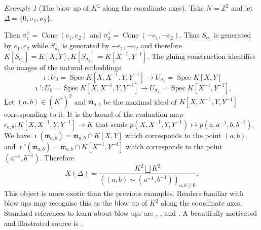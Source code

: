 \documentclass[BSc]{usydthesis}
\numberwithin{equation}{chapter}
\theoremstyle{remark}
\newtheorem{Example}[equation]{Example}
\newcommand{\Z}{\mathbb{Z}}
\newcommand{\V}{\vee}
\newcommand{\m}{\mathfrak{m}}
\DeclareMathOperator{\Cone}{Cone}
\DeclareMathOperator{\Spec}{Spec}
\begin{document}
\begin{Example}[The blow up of $K^2$ along the coordinate axes]
Take $N=\Z^2$ and let $\Delta =\{ 0, \sigma_1, \sigma_2\}.$

     \begin{figure}[ht]
  \centering
  \label{figure:lattice8}
\end{figure}

Then $\sigma^{\V}_1=\Cone(e_1, e_2)$ and $\sigma_2^{\V} = \Cone(-e_1, -e_2).$ Thus $S_{\sigma_1}$ is generated by $e_1, e_2$ while $S_{\sigma_2}$ is generated by $-e_1, -e_2$ and therefore $K[S_{\sigma_1}] = K[X,Y], K[S_{\sigma_2}]=K[X^{-1}, Y^{-1}].$ The gluing construction identifies the images of the natural embeddings $$ \imath : U_0 = \Spec K[X,X^{-1},Y , Y^{-1}] \to U_{\sigma_1} = \Spec K[X,Y] $$ $$ \ \imath': U_{0} = \Spec K[X,X^{-1}, Y ,Y^{-1}] \to U_{\sigma_2} = \Spec K[X^{-1}, Y^{-1}] . $$
Let $(a,b)\in (K^*)^2$ and $\m_{a,b}$ be the maximal ideal of $K[X,X^{-1}, Y, Y^{-1}]$ corresponding to it. It is the kernel of the evaluation map $\epsilon_{a,b} : K[X,X^{-1},Y, Y^{-1}] \to K$ that sends $p(X,X^{-1}, Y, Y^{-1}) \mapsto p(a,a^{-1}, b, b^{-1}).$ We have $\imath(\m_{a,b}) = \m_{a,b} \cap K[X,Y]$ which corresponds to the point $(a,b),$ and $\imath'(\m_{a,b}) = \m_{a,b} \cap K[X^{-1}, Y^{-1}]$ which corresponds to the point $(a^{-1}, b^{-1}).$ Therefore $$ X(\Delta) = \frac{ K^2 \bigsqcup K^2 }{ \left( (a,b) \sim (a^{-1}, b^{-1}) \right)_{a,b\neq 0} }.$$ This object is more exotic than the previous examples. Readers familiar with blow ups may recognise this as the blow up of $K^2$ along the coordinate axes. Standard references to learn about blow ups are \cite[p.~ 602-610]{GriffithsHarris}, \cite[Chapter 4, \S 2]{EisenbudHarris}, \cite[Chapter 2, \S 4]{Shafarevich1} and \cite[Chapter 1]{Hartshorne}. A beautifully motivated and illustrated source is \cite{Brodmann}.
\end{Example}
\end{document}
